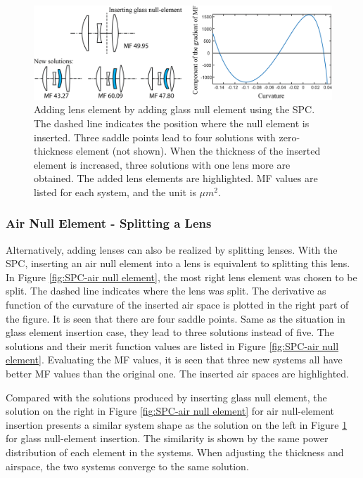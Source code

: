 \begin{figure}[h!]
    \centering
    \includegraphics[scale=0.68]{chapter-2/figures/spc_add_glass.png}
    \caption{Adding lens element by adding glass null element using the SPC. The dashed line indicates the position where the null element is inserted. Three saddle points lead to four solutions with zero-thickness element (not shown). When the thickness of the inserted element is increased, three solutions with one lens more are obtained. The added lens elements are highlighted. MF values are listed for each system, and the unit is $\mu m^2$. }
    \label{fig:SPC-glass null element}
\end{figure}

\subsubsection{Air Null Element - Splitting a Lens}

Alternatively, adding lenses can also be realized by splitting lenses. With the SPC, inserting an air null element into a lens is equivalent to splitting this lens. In Figure \ref{fig:SPC-air null element}, the most right lens element was chosen to be split. The dashed line indicates where the lens was split. The derivative as function of the curvature of the inserted air space is plotted in the right part of the figure. It is seen that there are four saddle points. Same as the situation in glass element insertion case, they lead to three solutions instead of five. The solutions and their merit function values are listed in Figure \ref{fig:SPC-air null element}. Evaluating the MF values, it is seen that three new systems all have better MF values than the original one. The inserted air spaces are highlighted.

Compared with the solutions produced by inserting glass null element, the solution on the right in Figure \ref{fig:SPC-air null element} for air null-element insertion presents a similar system shape as the solution on the left in Figure \ref{fig:SPC-glass null element} for glass null-element insertion. The similarity is shown by the same power distribution of each element in the systems. When adjusting the thickness and airspace, the two systems converge to the same solution. 


